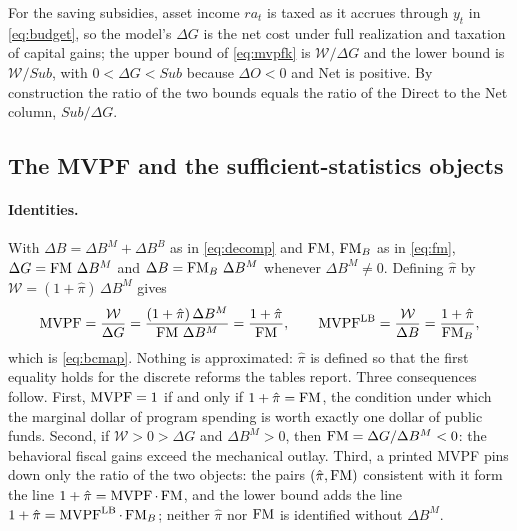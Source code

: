 For the saving subsidies, asset income $r a_t$ is taxed as it accrues through $y_t$ in \eqref{eq:budget}, so the model's $\Delta G$ is the net cost under full realization and taxation of capital gains; the upper bound of \eqref{eq:mvpfk} is $\mathcal{W}/\Delta G$ and the lower bound is $\mathcal{W}/\mathit{Sub}$, with $0<\Delta G<\mathit{Sub}$ because $\Delta O<0$ and Net is positive. By construction the ratio of the two bounds equals the ratio of the Direct to the Net column, $\mathit{Sub}/\Delta G$.

\subsection{The MVPF and the sufficient-statistics objects}\label{app:suffstat}

\paragraph{Identities.}
With $\Delta B=\Delta B^{M}+\Delta B^{B}$ as in \eqref{eq:decomp} and $\operatorname{FM}$, $\operatorname{FM}_B$ as in \eqref{eq:fm}, $\Delta G=\operatorname{FM}\,\Delta B^{M}$ and $\Delta B=\operatorname{FM}_B\,\Delta B^{M}$ whenever $\Delta B^{M}\neq0$. Defining $\hat\pi$ by $\mathcal{W}=(1+\hat\pi)\,\Delta B^{M}$ gives
\begin{equation}\label{eq:app-identities}
\operatorname{MVPF}=\frac{\mathcal{W}}{\Delta G}=\frac{(1+\hat\pi)\,\Delta B^{M}}{\operatorname{FM}\,\Delta B^{M}}=\frac{1+\hat\pi}{\operatorname{FM}},
\qquad
\operatorname{MVPF}^{\mathrm{LB}}=\frac{\mathcal{W}}{\Delta B}=\frac{1+\hat\pi}{\operatorname{FM}_B},
\end{equation}
which is \eqref{eq:bcmap}. Nothing is approximated: $\hat\pi$ is defined so that the first equality holds for the discrete reforms the tables report. Three consequences follow. First, $\operatorname{MVPF}=1$ if and only if $1+\hat\pi=\operatorname{FM}$, the condition under which the marginal dollar of program spending is worth exactly one dollar of public funds. Second, if $\mathcal{W}>0>\Delta G$ and $\Delta B^{M}>0$, then $\operatorname{FM}=\Delta G/\Delta B^{M}<0$: the behavioral fiscal gains exceed the mechanical outlay. Third, a printed MVPF pins down only the ratio of the two objects: the pairs $(\hat\pi,\operatorname{FM})$ consistent with it form the line $1+\hat\pi=\operatorname{MVPF}\cdot\operatorname{FM}$, and the lower bound adds the line $1+\hat\pi=\operatorname{MVPF}^{\mathrm{LB}}\cdot\operatorname{FM}_B$; neither $\hat\pi$ nor $\operatorname{FM}$ is identified without $\Delta B^{M}$.

